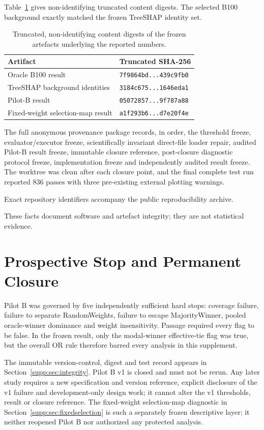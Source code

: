 \documentclass[runningheads,orivec]{llncs}
\newif\ifanon
\begin{document}
Table~\ref{supp:tab:digests} gives non-identifying truncated content digests. The selected B100
background exactly matched the frozen TreeSHAP identity set.

\begin{table}[t]
\centering
\caption{Truncated, non-identifying content digests of the frozen artefacts underlying the
reported numbers.}
\label{supp:tab:digests}
\small
\begin{tabular}{@{}ll@{}}
\toprule
Artifact & Truncated SHA-256\\
\midrule
Oracle B100 result & \texttt{7f9864bd...439c9fb0}\\
TreeSHAP background identities & \texttt{3184c675...1646eda1}\\
Pilot-B result & \texttt{05072857...9f787a88}\\
Fixed-weight selection-map result & \texttt{a1f293b6...d7e20f4e}\\
\bottomrule
\end{tabular}
\end{table}

The full anonymous provenance package records, in order, the
threshold freeze, evaluator/executor freeze, scientifically invariant direct-file loader repair,
audited Pilot-B result freeze, immutable closure reference, post-closure diagnostic protocol
freeze, implementation freeze and independently audited result freeze. The worktree was clean
after each closure point, and the final complete test run reported 836 passes with three
pre-existing external plotting warnings.
\ifanon
Exact repository identifiers are intentionally omitted here to protect anonymous review.
\else
Exact repository identifiers accompany the public reproducibility archive.
\fi
These facts document software and artefact integrity; they are not statistical evidence.

\section{Prospective Stop and Permanent Closure}

Pilot B was governed by five independently sufficient hard stops: coverage failure, failure to
separate RandomWeights, failure to escape MajorityWinner, pooled oracle-winner dominance and
weight insensitivity. Passage required every flag to be false. In the frozen result, only the
modal-winner effective-tie flag was true, but the overall OR rule therefore barred every
analysis in this supplement.

The immutable version-control, digest and test record appears in
Section~\ref{supp:sec:integrity}. Pilot B v1 is closed and must not be rerun. Any later study
requires a new specification and version reference, explicit disclosure of the v1 failure and
development-only design work; it cannot alter the v1 thresholds, result or closure reference.
The fixed-weight selection-map diagnostic in Section~\ref{supp:sec:fixedselection} is such a
separately frozen descriptive layer; it neither reopened Pilot B nor authorized any protected
analysis.
\end{document}
